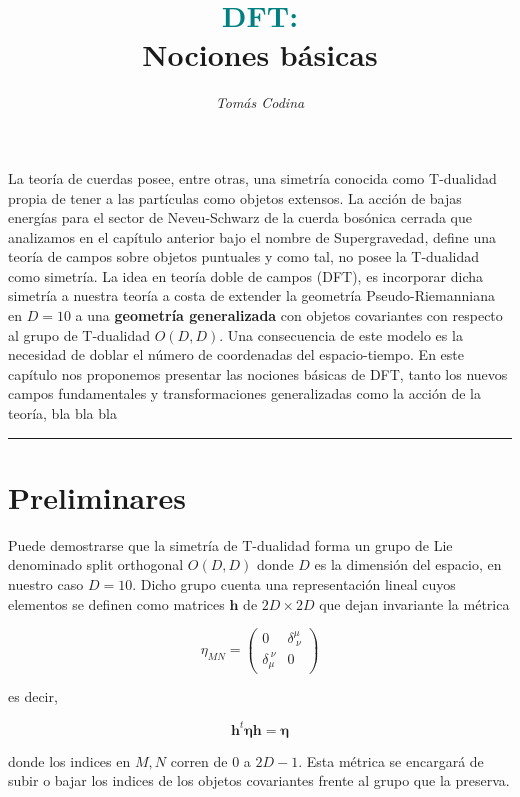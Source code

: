 \documentclass{article}
\title{\vspace{-35pt} \huge{\textbf{\textcolor{teal}{DFT:}}} \\ \vspace{0.1cm} \large{\textbf{Nociones básicas}}}
\date{\vspace{-20pt}}
\author{\textit{Tomás Codina}}
\numberwithin{equation}{section}
\begin{document}
\maketitle
\thispagestyle{fancy}

La teoría de cuerdas posee, entre otras, una simetría conocida como T-dualidad propia de tener a las partículas como objetos extensos. La acción de bajas energías para el sector de Neveu-Schwarz de la cuerda bosónica cerrada que analizamos en el capítulo anterior bajo el nombre de Supergravedad, define una teoría de campos sobre objetos puntuales y como tal, no posee la T-dualidad como simetría. La idea en teoría doble de campos (DFT), es incorporar dicha simetría a nuestra teoría a costa de extender la geometría Pseudo-Riemanniana en $ D=10 $ a una \textbf{geometría generalizada} con objetos covariantes con respecto al grupo de T-dualidad $ O(D,D) $. Una consecuencia de este modelo es la necesidad de doblar el número de coordenadas del espacio-tiempo. En este capítulo nos proponemos presentar las nociones básicas de DFT, tanto los nuevos campos fundamentales y transformaciones generalizadas como la acción de la teoría, bla bla bla
\rule{\textwidth}{0.4pt}

\section{Preliminares}\label{sec_preliminares}

Puede demostrarse que la simetría de T-dualidad forma un grupo de Lie denominado split orthogonal $ O(D,D) $ donde $ D $ es la dimensión del espacio, en nuestro caso $ D=10 $. Dicho grupo cuenta una representación lineal cuyos elementos se definen como matrices $ \textbf{h} $ de $ 2D \times 2D $ que dejan invariante la métrica

\begin{equation}\label{key}
\eta_{MN} = \begin{pmatrix}
0 & \delta^{\mu}_{ \ \nu} \\
\delta_{\mu}^{ \ \nu} & 0 
\end{pmatrix}
\end{equation}

es decir,

\begin{equation}\label{key}
\textbf{h}^t \pmb{\eta} \textbf{h} = \pmb{\eta}
\end{equation}

donde los indices en $ M,N $ corren de $ 0 $ a $ 2D-1 $. Esta métrica se encargará de subir o bajar los indices de los objetos covariantes frente al grupo que la preserva.
\end{document}
